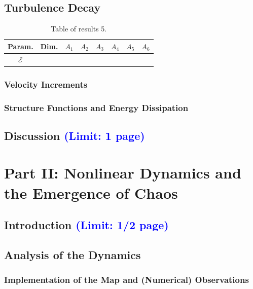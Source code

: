 \documentclass[11pt,titlepage]{article}
\begin{document}
\subsection{Turbulence Decay} \label{turbulence_decay}
\begin{table}[h!]
\centering
\caption{Table of results 5.}
    \begin{tabular}{ | c | c | c | c | c | c | c | c |}
        \hline
        Param. & Dim. & $A_1$ & $A_2$ & $A_3$ & $A_4$ & $A_5$ & $A_6$ \\
        \hline
        $\mathcal{E}$ & & & & & & & \\
        \hline
    \end{tabular}
\end{table}

\subsubsection{Velocity Increments}

\subsubsection{Structure Functions and Energy Dissipation}

\subsection{Discussion \textcolor{blue}{(Limit: 1 page)}} %

\newpage
\section{Part II: Nonlinear Dynamics and the Emergence of Chaos}


\subsection{Introduction \textcolor{blue}{(Limit: 1/2 page)}} %
\subsection{Analysis of the Dynamics}
\subsubsection{Implementation of the Map and (Numerical) Observations}
\end{document}
